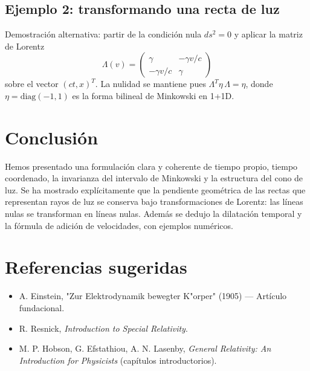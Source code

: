\documentclass[12pt,oneside]{book}
\begin{document}
\section{Ejemplo 2: transformando una recta de luz}
Demostración alternativa: partir de la condición nula $ds^2=0$ y aplicar la matriz de Lorentz
\begin{equation}
  \Lambda( v) = \begin{pmatrix}\gamma & -\gamma v/c\\ -\gamma v/c & \gamma\end{pmatrix}
\end{equation}
sobre el vector $(ct,x)^{T}$. La nulidad se mantiene pues $\Lambda^{T} \eta\, \Lambda = \eta$, donde $\eta=\mathrm{diag}(-1,1)$ es la forma bilineal de Minkowski en 1+1D.

\chapter{Conclusión}
Hemos presentado una formulación clara y coherente de tiempo propio, tiempo coordenado, la invarianza del intervalo de Minkowski y la estructura del cono de luz. Se ha mostrado explícitamente que la pendiente geométrica de las rectas que representan rayos de luz se conserva bajo transformaciones de Lorentz: las líneas nulas se transforman en líneas nulas. Además se dedujo la dilatación temporal y la fórmula de adición de velocidades, con ejemplos numéricos.

\backmatter
\chapter*{Referencias sugeridas}
\begin{itemize}
  \item A. Einstein, "Zur Elektrodynamik bewegter K{"o}rper" (1905) — Artículo fundacional.
  \item R. Resnick, \emph{Introduction to Special Relativity}.
  \item M. P. Hobson, G. Efstathiou, A. N. Lasenby, \emph{General Relativity: An Introduction for Physicists} (capítulos introductorios).
\end{itemize}
\end{document}
